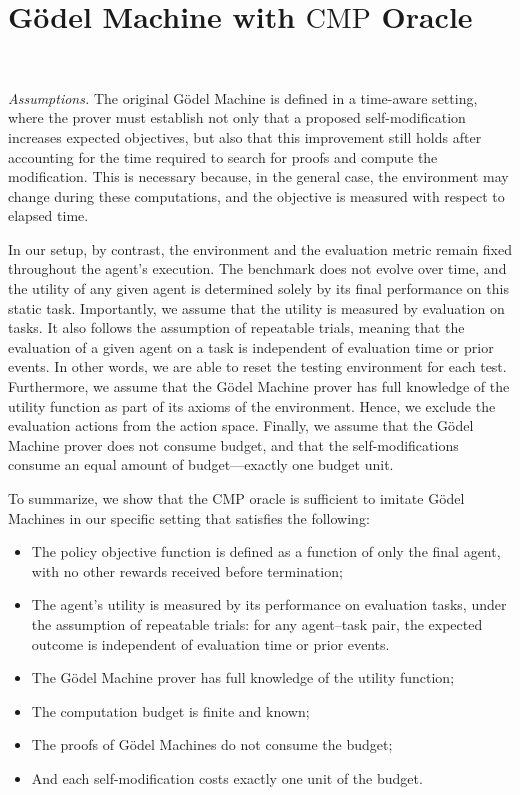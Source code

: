 \documentclass{article} %
\begin{document}




\appendix

\newpage


\section{G\"odel Machine with $\mathrm{CMP}$ Oracle}~\label{app:GM_CMP}


\textit{Assumptions. }The original G\"odel Machine is defined in a time-aware setting, where the prover must establish not only that a proposed self-modification increases expected objectives, but also that this improvement still holds after accounting for the time required to search for proofs and compute the modification. This is necessary because, in the general case, the environment may change during these computations, and the objective is measured with respect to elapsed time.

In our setup, by contrast, the environment and the evaluation metric remain fixed throughout the agent’s execution. The benchmark does not evolve over time, and the utility of any given agent is determined solely by its final performance on this static task. Importantly, we assume that the utility is measured by evaluation on tasks. It also follows the assumption of repeatable trials, meaning that the evaluation of a given agent on a task is independent of evaluation time or prior events. In other words, we are able to reset the testing environment for each test.
Furthermore, we assume that the G\"odel Machine prover has full knowledge of the utility function as part of its axioms of the environment. Hence, we exclude the evaluation actions from the action space. 
Finally, we assume that the G\"odel Machine prover does not consume budget, and that the self-modifications consume an equal amount of budget—exactly one budget unit.


To summarize, we show that the $\mathrm{CMP}$ oracle is sufficient to imitate G\"odel Machines in our specific setting that satisfies the following: \begin{itemize}
    \item The policy objective function is defined as a function of only the final agent, with no other rewards received before termination;
    \item The agent’s utility is measured by its performance on evaluation tasks, under the assumption of repeatable trials: for any agent–task pair, the expected outcome is independent of evaluation time or prior events.
    \item The G\"odel Machine prover has full knowledge of the utility function;
    \item The computation budget is finite and known;
    \item The proofs of G\"odel Machines do not consume the budget;
    \item And each self-modification costs exactly one unit of the budget.
\end{itemize}
\end{document}
